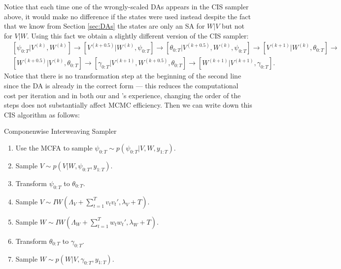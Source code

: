 \documentclass{article}
\begin{document}
Notice that each time one of the wrongly-scaled DAs appears in the CIS sampler above, it would make no difference if the states were used instead despite the fact that we know from Section \ref{sec:DAs} the states are only an SA for $W|V$ but not for $V|W$. Using this fact we obtain a slightly different version of the CIS sampler:
\begin{align*}
&[\psi_{0:T}|V^{(k)},W^{(k)}] \to [V^{(k+0.5)}|W^{(k)},\psi_{0:T}] \to [\theta_{0:T}|V^{(k+0.5)},W^{(k)},\psi_{0:T}] \to [V^{(k+1)}|W^{(k)},\theta_{0:T}]\to\\
&[W^{(k+0.5)}|V^{(k)},\theta_{0:T}] \to [\gamma_{0:T}|V^{(k+1)},W^{(k+0.5)},\theta_{0:T}]\to [W^{(k+1)}|V^{(k+1)},\gamma_{0:T}].
\end{align*}
Notice that there is no transformation step at the beginning of the second line since the DA is already in the correct form --- this reduces the computational cost per iteration and in both our and 's experience, changing the order of the steps does not substantially affect MCMC efficiency. Then we can write down this CIS algorithm as follows:
\begin{alg*}[CIS]Componenwise Interweaving Sampler\label{alg:DLMcis}
\begin{enumerate}
\item Use the MCFA to sample $\psi_{0:T} \sim p(\psi_{0:T}|V,W,y_{1:T})$.
\item Sample $V \sim p(V|W,\psi_{0:T},y_{1:T})$.
\item Transform $\psi_{0:T}$ to $\theta_{0:T}$.
\item Sample $V \sim IW\left(\Lambda_V + \sum_{t=1}^Tv_tv_t',\lambda_V + T\right)$.
\item Sample $W \sim IW\left(\Lambda_W + \sum_{t=1}^Tw_tw_t',\lambda_{W} + T\right)$.
\item Transform $\theta_{0:T}$ to $\gamma_{0:T}$.
\item Sample $W \sim p(W|V,\gamma_{0:T},y_{1:T})$.
\end{enumerate}
\end{alg*}
\end{document}
